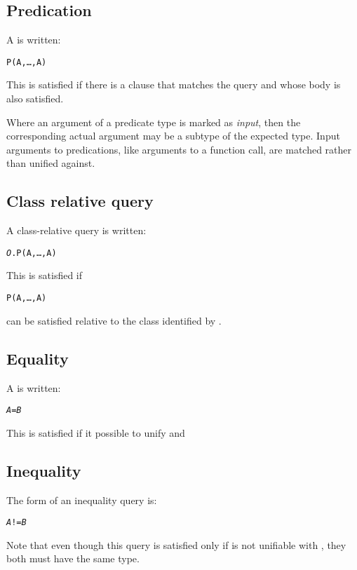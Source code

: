\subsection{Predication}
\label{goal:predication}

A  is written:
\begin{alltt}
P(A,\ldots,A\subn)
\end{alltt}
This is satisfied if there is a clause that matches the query and whose body is also satisfied.

Where an argument of a predicate type is marked as \emph{input}, then the corresponding actual argument may be a subtype of the expected type. Input arguments to predications, like arguments to a function call, are matched rather than unified against.

\subsection{Class relative query}
\label{goal:dot}
A class-relative query is written:
\begin{alltt}
\emph{O}.P(A,\ldots,A\subn)
\end{alltt}
This is satisfied if
\begin{alltt}
P(A,\ldots,A\subn)
\end{alltt}
can be satisfied relative to the class identified by .

\subsection{Equality}
\label{goal:equality}

A \q{=} is written:
\begin{alltt}
\emph{A} = \emph{B}
\end{alltt}
This is satisfied if it possible to unify  and 

\subsection{Inequality}
\label{goal:notequality}

The form of an inequality query is:
\begin{alltt}
\emph{A} != \emph{B}
\end{alltt}
Note that even though this query is satisfied only if  is not unifiable with , they both must have the same type.

